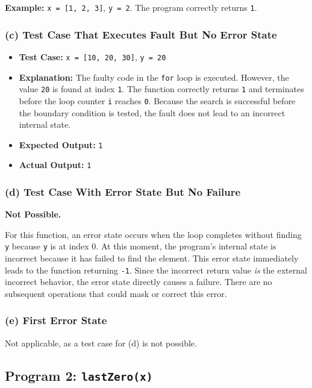\documentclass[11pt,a4paper]{article}
\begin{document}
\textbf{Example:} \texttt{x = [1, 2, 3]}, \texttt{y = 2}. The program correctly returns \texttt{1}.

\subsubsection{(c) Test Case That Executes Fault But No Error State}

\begin{itemize}[leftmargin=*]
    \item \textbf{Test Case:} \texttt{x = [10, 20, 30]}, \texttt{y = 20}
    \item \textbf{Explanation:} The faulty code in the \texttt{for} loop is executed. However, the value \texttt{20} is found at index \texttt{1}. The function correctly returns \texttt{1} and terminates before the loop counter \texttt{i} reaches \texttt{0}. Because the search is successful before the boundary condition is tested, the fault does not lead to an incorrect internal state.
    \item \textbf{Expected Output:} \texttt{1}
    \item \textbf{Actual Output:} \texttt{1}
\end{itemize}

\subsubsection{(d) Test Case With Error State But No Failure}

\textbf{Not Possible.}

 For this function, an error state occurs when the loop completes without finding \texttt{y} because \texttt{y} is at index 0. At this moment, the program's internal state is incorrect because it has failed to find the element. This error state immediately leads to the function returning \texttt{-1}. Since the incorrect return value \textit{is} the external incorrect behavior, the error state directly causes a failure. There are no subsequent operations that could mask or correct this error.

\subsubsection{(e) First Error State}

Not applicable, as a test case for (d) is not possible.

\subsection{Program 2: \texttt{lastZero(x)}}
\end{document}
